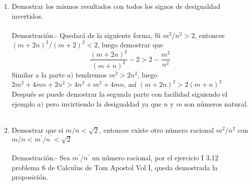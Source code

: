 \begin{teo}
\begin{enumerate}[\bfseries a)]
\item Demostrar los mismos resultados con todos los signos de desigualdad invertidos. \\\\
Demostración.- \; Quedará de la siguiente forma, Si $m^2/n^2>2$, entonces $\left( m+2n \right)^2 / \left( m + 2 \right)^2 < 2$, luego demostrar que $$\dfrac{\left( m + 2n \right)^2}{\left( m + n \right)^2} - 2 > 2 - \dfrac{m^2}{n^2}$$
Similar a la parte $a)$ tendremos $m^2 > 2n^2$, luego $2m^2 + 4mn + 2n^2 > 4n^2 + m^2 + 4mn$, así $ (m+2n)^2 > 2(m + n)^2 $\\
Después se puede demostrar la segunda parte con facilidad siguiendo el ejemplo $a)$ pero invirtiendo la desigualdad ya que $n$ \; y \; $m$ son números natural.\\\\

\item Demostrar que si $m/n < \sqrt{2}$, entonces existe otro número racional $m^2 / n^2$ con $m/n < m^{'} / n^{'} < \sqrt{2}$\\\\
Demostración.- \; Sea $m^{'}/n^{'}$ un número racional, por el ejercicio I 3.12 problema 6 de Calculus de Tom Apostol Vol I, queda demostrada la proposición.\\\\
\end{enumerate}
\end{teo}

